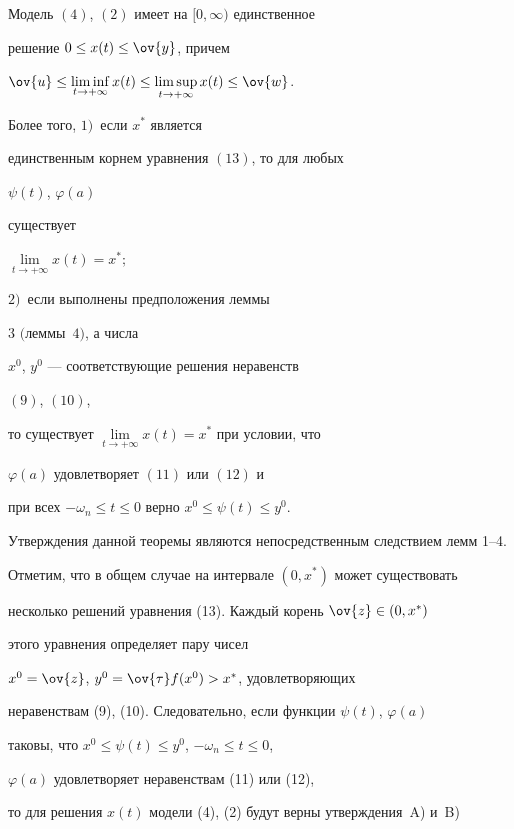 \begin{thmnonum}


Модель $(4)$, $(2)$ имеет на $[0, \infty)$ единственное


решение $0 \leq x(t) \leq \ov{y}$, причем


$\ov{u} \leq \underset{t\to+\infty}\liminf\, x(t)


\leq \underset{t\to+\infty}\limsup\, x(t) \leq \ov{w}$.


Более того, $1)$~если $x^{*}$ является


единственным корнем уравнения $(13)$, то для любых


$\psi(t)$, $\varphi(a)$


существует


$\lim\limits_{t\to+\infty} x(t)=x^{*};$


$2)$~если выполнены предположения леммы


$3$ $($леммы~$4)$, а числа


$x^{0}$, $y^{0}$ --- соответствующие решения неравенств


$(9)$, $(10)$,


то существует $\lim\limits_{t\to+\infty} x(t)=x^{*}$ при условии, что


$\varphi(a)$ удовлетворяет $(11)$ или $(12)$ и


при всех $- \omega_{n} \leq t \leq 0$ верно $x^{0} \leq \psi(t) \leq y^{0}$.


\end{thmnonum}





Утверждения данной теоремы являются непосредственным следствием лемм 1--4.


Отметим, что в общем случае на интервале $(0, x^{*})$ может существовать


несколько решений уравнения (13). Каждый корень $\ov{z} \in (0, x^{*})$


этого уравнения определяет пару чисел


$x^{0}=\ov{z}$, $y^{0}=\ov{\tau} f(x^{0}) > x^{*}$, удовлетворяющих


неравенствам (9), (10). Следовательно, если функции $\psi(t)$, $\varphi(a)$


таковы, что $x^{0} \leq \psi(t) \leq y^{0}$, $- \omega_{n} \leq t \leq 0$,


$\varphi(a)$ удовлетворяет неравенствам (11) или (12),


то для решения $x(t)$ модели (4), (2) будут верны утверждения~A) и~B)


